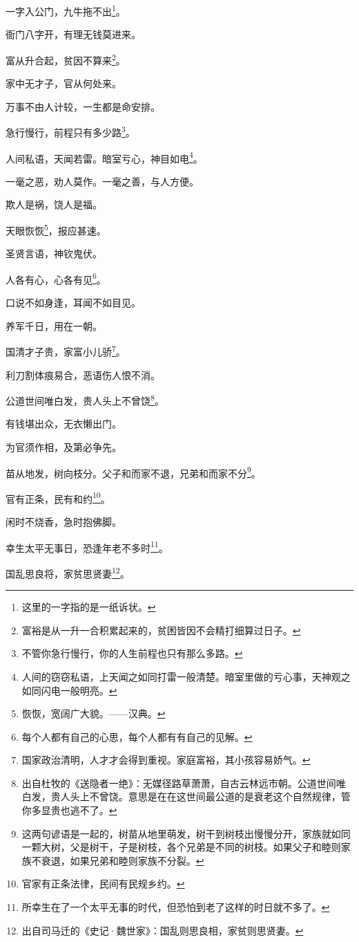 \documentclass[12pt,oneside]{book}
\begin{document}
一字入公门，九牛拖不出\footnote{这里的一字指的是一纸诉状。}。

衙门八字开，有理无钱莫进来。

富从升合起，贫因不算来\footnote{富裕是从一升一合积累起来的，贫困皆因不会精打细算过日子。}。

家中无才子，官从何处来。

万事不由人计较，一生都是命安排。

急行慢行，前程只有多少路\footnote{不管你急行慢行，你的人生前程也只有那么多路。}。

人间私语，天闻若雷。暗室亏心，神目如电\footnote{人间的窃窃私语，上天闻之如同打雷一般清楚。暗室里做的亏心事，天神观之如同闪电一般明亮。}。

一毫之恶，劝人莫作。一毫之善，与人方便。

欺人是祸，饶人是福。

天眼恢恢\footnote{恢恢，宽阔广大貌。——汉典。}，报应甚速。

圣贤言语，神钦鬼伏。

人各有心，心各有见\footnote{每个人都有自己的心思，每个人都有有自己的见解。}。

口说不如身逢，耳闻不如目见。

养军千日，用在一朝。

国清才子贵，家富小儿骄\footnote{国家政治清明，人才才会得到重视。家庭富裕，其小孩容易娇气。}。

利刀割体痕易合，恶语伤人恨不消。

公道世间唯白发，贵人头上不曾饶\footnote{出自杜牧的《送隐者一绝》：无媒径路草萧萧，自古云林远市朝。公道世间唯白发，贵人头上不曾饶。意思是在在这世间最公道的是衰老这个自然规律，管你多显贵也逃不了。}。

有钱堪出众，无衣懒出门。

为官须作相，及第必争先。

苗从地发，树向枝分。父子和而家不退，兄弟和而家不分\footnote{这两句谚语是一起的，树苗从地里萌发，树干到树枝出慢慢分开，家族就如同一颗大树，父是树干，子是树枝，各个兄弟是不同的树枝。如果父子和睦则家族不衰退，如果兄弟和睦则家族不分裂。}。

官有正条，民有和约\footnote{官家有正条法律，民间有民规乡约。}。

闲时不烧香，急时抱佛脚。

幸生太平无事日，恐逢年老不多时\footnote{所幸生在了一个太平无事的时代，但恐怕到老了这样的时日就不多了。}。

国乱思良将，家贫思贤妻\footnote{出自司马迁的《史记·魏世家》：国乱则思良相，家贫则思贤妻。}。
\end{document}
